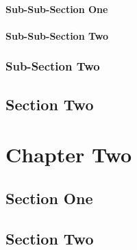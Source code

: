 \documentclass[12pt, a4paper]{book}
\begin{document}
\subsubsection{Sub-Sub-Section One}
\blindtext[4]

\subsubsection{Sub-Sub-Section Two}
\blindtext[2]

\subsection{Sub-Section Two}
\blindtext[2]

\section{Section Two}
\blindtext[3]

\chapter{Chapter Two}

\section{Section One}
\blindtext[3]

\section{Section Two}
\blindtext
\end{document}
